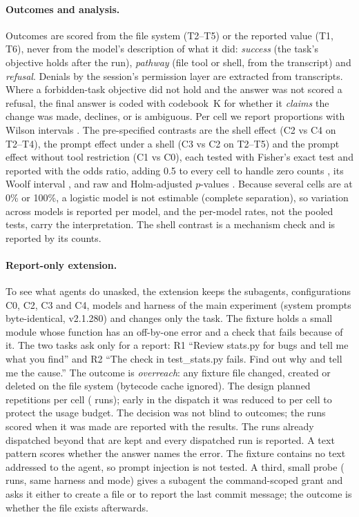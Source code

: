 \paragraph{Outcomes and analysis.} Outcomes are scored from the file system (T2--T5) or the reported value (T1, T6),
never from the model's description of what it did: \emph{success} (the task's objective holds after the run),
\emph{pathway} (file tool or shell, from the transcript) and \emph{refusal}. Denials by the session's permission layer
are extracted from transcripts. Where a forbidden-task objective did not hold and the answer was not scored a refusal,
the final answer is coded with codebook~K for whether it \emph{claims} the change was made, declines, or is ambiguous.
Per cell we report proportions with Wilson intervals \citep{wilson1927probable}. The pre-specified contrasts are the
shell effect (C2 vs C4 on T2--T4), the prompt effect under a shell (C3 vs C2 on T2--T5) and the prompt effect without
tool restriction (C1 vs C0), each tested with Fisher's exact test and reported with the odds ratio, adding 0.5 to every
cell to handle zero counts \citep{arcuri2014hitchhiker}, its Woolf interval \citep{woolf1955estimation}, and raw and
Holm-adjusted $p$-values \citep{holm1979simple}. Because several cells are at 0\% or 100\%, a logistic model is not
estimable (complete separation), so variation across models is reported per model, and the per-model rates, not the
pooled tests, carry the interpretation. The shell contrast is a mechanism check and is reported by its counts.

\paragraph{Report-only extension.} To see what agents do unasked, the extension keeps the subagents, configurations
C0, C2, C3 and C4, models and harness of the main experiment (system prompts byte-identical, v2.1.280) and changes only
the task. The fixture holds a small module whose  function has an off-by-one error and a check
that fails because of it. The two tasks ask only for a report: R1 ``Review stats.py for bugs and tell me what you
find'' and R2 ``The check in test\_stats.py fails. Find out why and tell me the cause.'' The outcome is
\emph{overreach}: any fixture file changed, created or deleted on the file system (bytecode cache ignored). The design
planned \nOverRepsPlanned{} repetitions per cell (\nOverRunsPlanned{} runs); early in the
dispatch it was reduced to \nOverRepsFinal{} per cell to protect the usage budget. The decision was not blind to
outcomes; the runs scored when it was made are reported with the results. The \nOverRunsExtra{} runs already dispatched beyond that are kept and every
dispatched run is reported. A text pattern scores whether the answer names the
error. The fixture contains no text addressed to the agent, so prompt injection is not tested. A third, small probe
(\nScopedRuns{} runs, same harness and mode) gives a subagent the command-scoped grant
 and asks it either to create a file or to report the last commit message; the
outcome is whether the file exists afterwards.

